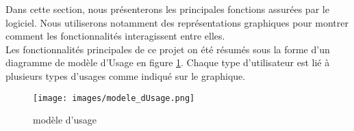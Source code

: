 Dans cette section, nous présenterons les principales fonctions assurées par le logiciel. Nous utiliserons notamment des représentations graphiques pour montrer comment les fonctionnalités interagissent entre elles.\\




Les fonctionnalités principales de ce projet on été résumés sous la forme d'un diagramme de modèle d'Usage en figure \ref{mod_use}. Chaque type d'utilisateur est lié à plusieurs types d'usages comme indiqué sur le graphique.

\begin{figure}
	\centering
	\texttt{[image: images/modele\_dUsage.png]}
	\caption{\label{mod_use} modèle d'usage}
\end{figure}
